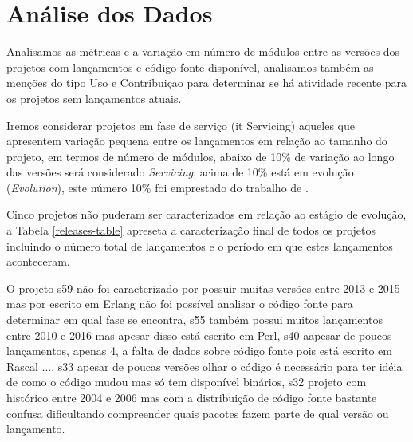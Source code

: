 
\section{Análise dos Dados} \label{estudo3:analise} %

Analisamos as métricas e a variação em número de módulos entre as versões dos
projetos com lançamentos e código fonte disponível, analisamos também as
menções do tipo Uso e Contribuiçao para determinar se há atividade recente para
os projetos sem lançamentos atuais.

Iremos considerar projetos em fase de serviço ({it Servicing}) aqueles que
apresentem variação pequena entre os lançamentos em relação ao tamanho do
projeto, em termos de número de módulos, abaixo de 10\% de variação ao longo
das versões será considerado {\it Servicing}, acima de 10\% está em evolução
({\it Evolution}), este número 10\% foi emprestado do trabalho de
.



Cinco projetos não puderam ser caracterizados em relação ao estágio de
evolução, a Tabela \ref{releases-table} apreseta a caracterização final de
todos os projetos incluindo o número total de lançamentos e o período em que
estes lançamentos aconteceram.



O projeto s59 não foi caracterizado por possuir muitas versões entre 2013 e
2015 mas por escrito em Erlang não foi possível analisar o código fonte para
determinar em qual fase se encontra, s55 também possui muitos lançamentos entre
2010 e 2016 mas apesar disso está escrito em Perl, s40 aapesar de poucos
lançamentos, apenas 4, a falta de dados sobre código fonte pois está escrito em
Rascal ..., s33 apesar de poucas versões olhar o código é necessário para ter
idéia de como o código mudou mas só tem disponível binários, s32 projeto com
histórico entre 2004 e 2006 mas com a distribuição de código fonte bastante
confusa dificultando compreender quais pacotes fazem parte de qual versão ou
lançamento.


